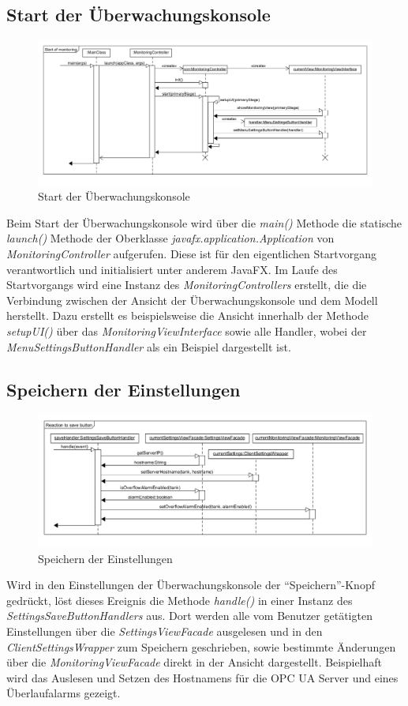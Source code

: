 \documentclass[parskip=full]{scrartcl}
\begin{document}
\subsection{Start der Überwachungskonsole}
\begin{figure}[H]
	\centering
	\includegraphics[scale=0.4]{design/sequence-diagrams/start-of-monitoring.png}
	\caption{Start der Überwachungskonsole}
\end{figure}
Beim Start der Überwachungskonsole wird über die \emph{main()} Methode die statische \emph{launch()} Methode der Oberklasse \emph{javafx.application.Application} von \emph{MonitoringController} aufgerufen. Diese ist für den eigentlichen Startvorgang verantwortlich und initialisiert unter anderem JavaFX.
Im Laufe des Startvorgangs wird eine Instanz des \emph{MonitoringControllers} erstellt, die die Verbindung zwischen der Ansicht der Überwachungskonsole und dem Modell herstellt. Dazu erstellt es beispielsweise die Ansicht innerhalb der Methode \emph{setupUI()} über das \emph{MonitoringViewInterface} sowie alle Handler, wobei der \emph{MenuSettingsButtonHandler} als ein Beispiel dargestellt ist.

\subsection{Speichern der Einstellungen}
\begin{figure}[H]
	\centering
	\includegraphics[scale=0.4]{design/sequence-diagrams/Save-settings.png}
	\caption{Speichern der Einstellungen}
\end{figure}
Wird in den Einstellungen der Überwachungskonsole der "`Speichern"'-Knopf gedrückt, löst dieses Ereignis die Methode \emph{handle()} in einer Instanz des \emph{SettingsSaveButtonHandlers} aus.
Dort werden alle vom Benutzer getätigten Einstellungen über die \emph{SettingsViewFacade} ausgelesen und in den \emph{ClientSettingsWrapper} zum Speichern geschrieben, sowie bestimmte Änderungen über die \emph{MonitoringViewFacade} direkt in der Ansicht dargestellt.
Beispielhaft wird das Auslesen und Setzen des Hostnamens für die OPC UA Server und eines Überlaufalarms gezeigt.
\end{document}
